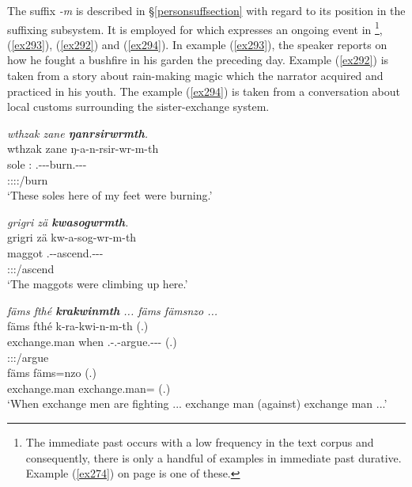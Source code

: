 The  suffix \emph{-m} is described in \S{}\ref{personsuffsection} with regard to its position in the suffixing subsystem. It is employed for   which expresses an ongoing event in \footnote{The immediate past occurs with a low frequency in the text corpus and consequently, there is only a handful of examples in immediate past durative. Example (\ref{ex274}) on page \pageref{ex274} is one of these.},  (\ref{ex293}),  (\ref{ex292}) and  (\ref{ex294}). In example (\ref{ex293}), the speaker reports on how he fought a bushfire in his garden the preceding day. Example (\ref{ex292}) is taken from a story about rain-making magic which the narrator acquired and practiced in his youth. The  example (\ref{ex294}) is taken from a conversation about local customs surrounding the sister-exchange system.

\begin{exe}
	\ex \emph{wthzak zane \textbf{ŋanrsirwrmth}.}\\
	\glll wthzak zane ŋ-a-n-rsir-wr-m-th\\
	sole \Dem:\Prox{} \M.\Alph-\Vc-\Venit-burn.\Ext-\Ndu-\Dur-\Stnsg\\
	{} {} \footnotesize{\Stpl:\Sbj:\Rpst:\Dur:\Venit/burn}\\
	\trans `These soles here of my feet were burning.' 
	\label{ex293}
\end{exe}
\begin{exe}
	\ex \emph{grigri zä \textbf{kwasogwrmth}.}\\
	\glll grigri zä kw-a-sog-wr-m-th\\
	maggot \Prox{} \M.\Betatwo-\Vc-ascend.\Ext-\Ndu-\Dur-\Stnsg\\
	{} {} \footnotesize{\Stpl:\Sbj:\Pst:\Dur/ascend}\\
	\trans `The maggots were climbing up here.' 
	\label{ex292}
\end{exe}
\begin{exe}
	\ex \emph{fäms fthé \textbf{krakwinmth} ... fäms fämsnzo ...}\\
	\glll fäms fthé k-ra-kwi-n-m-th (.)\\
	exchange.man when \M.\Bet-\Irr.\Vc-argue.\Ext-\Du-\Dur-\Stnsg{} (.)\\
	{} {} \footnotesize{\Stdu:\Sbj:\Irr:\Ipfv/argue} {}\\
	\sn
	\gll fäms fäms=nzo (.)\\
	exchange.man exchange.man=\Only{} (.)\\
	\trans `When exchange men are fighting ... exchange man (against) exchange man ...' 
	\label{ex294}
\end{exe}

